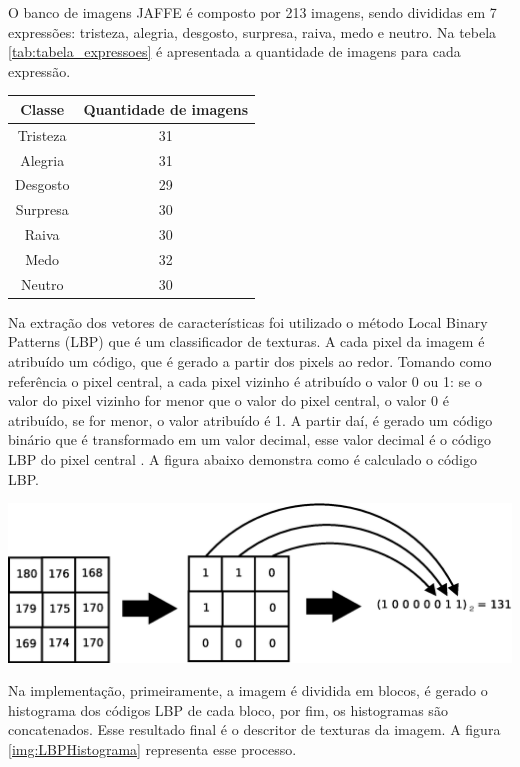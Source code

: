 \begin{itemize}
O banco de imagens JAFFE é composto por 213 imagens, sendo divididas em 7 expressões: tristeza, alegria, desgosto, surpresa, raiva, medo e neutro. Na tebela \ref{tab:tabela_expressoes} é apresentada a quantidade de imagens para cada expressão.

\begin{center}
	\begin{tabular}{cc}
        \hline
        Classe & Quantidade de imagens \\
        \hline
		Tristeza & 31 \\
		Alegria & 31 \\
		Desgosto & 29 \\
		Surpresa & 30 \\
		Raiva & 30 \\
		Medo & 32 \\
		Neutro & 30 \\
        \hline
	\end{tabular}
        \label{tab:tabela_expressoes}
\end{center}

Na extração dos vetores de características foi utilizado o método Local Binary Patterns (LBP) que é um classificador de texturas. A cada pixel da imagem é atribuído um código, que é gerado a partir dos pixels ao redor. Tomando como referência o pixel central, a cada pixel vizinho é atribuído o valor 0 ou 1: se o valor do pixel vizinho for menor que o valor do pixel central, o valor 0 é atribuído, se for menor, o valor atribuído é 1. A partir daí, é gerado um código binário que é transformado em um valor decimal, esse valor decimal é o código LBP do pixel central \cite{LBPShan2009}. A figura abaixo demonstra como é calculado o código LBP.

\begin{center}
	\includegraphics[scale=0.5]{graficos/LBP}
	\label{img:LBP}
\end{center}

Na implementação, primeiramente, a imagem é dividida em blocos, é gerado o histograma dos códigos LBP de cada bloco, por fim, os histogramas são concatenados. Esse resultado final é o descritor de texturas da imagem. A figura \ref{img:LBPHistograma} representa esse processo.


\end{itemize}
